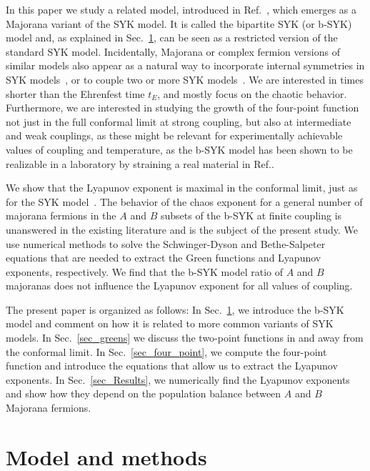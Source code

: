 In this paper we study a related model, introduced in Ref.~\cite{Fremling_2022,fremling_bipartite_2021}, which emerges as a Majorana variant of the SYK model. 
It is called the bipartite SYK (or b-SYK) model and, as explained in Sec.~\ref{sec_model},
can be seen as a restricted version of the standard SYK model. Incidentally,
Majorana or complex fermion versions of similar models also appear as a natural way to incorporate internal symmetries in SYK models~\cite{lantagne2020diagnosing,Kim2019,sahoo_traversable_2020},
or to couple two or more SYK models~\cite{chowdhury_translationally_2018}.
We are interested in times shorter than the Ehrenfest time $t_E$, and mostly focus on the chaotic behavior. Furthermore, we are interested in studying the growth of the four-point function not just in the full conformal limit at strong coupling, but also at intermediate and weak couplings, as these might be relevant for experimentally achievable values of coupling and temperature, as the b-SYK model has been shown to be realizable in a laboratory by straining a real material in Ref.\cite{fremling_bipartite_2021}.
%

We show that the Lyapunov exponent is maximal in the conformal limit, just as for the SYK model~\cite{stanford_many-body_2016,maldacena_bound_2016,maldacena_comments_2016}. The behavior of the chaos exponent for a general number of majorana fermions in the $A$ and $B$ subsets of the b-SYK at finite coupling is unanswered in the existing literature and is the subject of the present study.
We use numerical methods to solve the Schwinger-Dyson and Bethe-Salpeter equations that are needed to extract the Green functions and Lyapunov exponents, respectively.
We find that the b-SYK model ratio of $A$ and $B$ majoranas does not influence the Lyapunov exponent for all values of coupling.



The present paper is organized as follows:
In Sec.~\ref{sec_model}, we introduce the b-SYK model and comment on how it is related to more common variants of SYK models.
In Sec.~\ref{sec_greens} we discuss the two-point functions in and away from the conformal limit. In Sec.~\ref{sec_four_point},
we compute the four-point function and introduce the equations that allow us to extract the Lyapunov exponents. In Sec.~\ref{sec_Results},
we numerically find the Lyapunov exponents and show how they depend on the population balance between $A$ and $B$ Majorana fermions.



\section{Model and methods}\label{sec_model}


